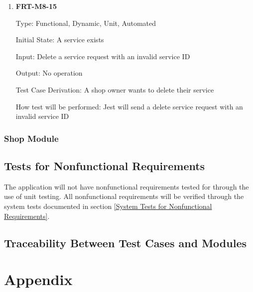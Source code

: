 \documentclass[12pt, titlepage]{article}
\begin{document}
\begin{enumerate}
	\item \textbf{FRT-M8-15}

	      Type: Functional, Dynamic, Unit, Automated

	      Initial State: A service exists

	      Input: Delete a service request with an invalid service ID

	      Output: No operation

	      Test Case Derivation: A shop owner wants to delete their service

	      How test will be performed: Jest will send a delete service request with an invalid service ID

\end{enumerate}

\subsubsection{Shop Module}

\subsection{Tests for Nonfunctional Requirements}

The application will not have nonfunctional requirements tested for through the use of unit
testing. All nonfunctional requirements will be verified through the system tests documented in
section \ref{System Tests for Nonfunctional Requirements}.

\subsection{Traceability Between Test Cases and Modules}






\newpage

\section{Appendix}


\end{document}
